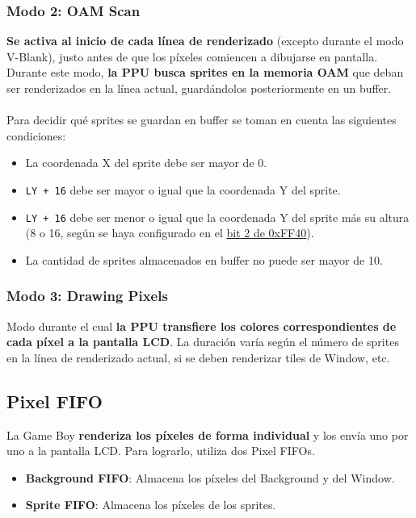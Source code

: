 \subsubsection{Modo 2: OAM Scan}
\textbf{Se activa al inicio de cada línea de renderizado} (excepto durante el modo V-Blank), justo antes de que los píxeles comiencen a dibujarse en pantalla. Durante este modo, \textbf{la PPU busca sprites en la memoria OAM} que deban ser renderizados en la línea actual, guardándolos posteriormente en un buffer.
\\\\
Para decidir qué sprites se guardan en buffer se toman en cuenta las siguientes condiciones:
\begin{itemize}
    \item La coordenada X del sprite debe ser mayor de 0.
    \item \texttt{LY + 16} debe ser mayor o igual que la coordenada Y del sprite.
    \item \texttt{LY + 16} debe ser menor o igual que la coordenada Y del sprite más su altura (8 o 16, según se haya configurado en el \hyperref[lcd_control]{bit 2 de 0xFF40}).
    \item La cantidad de sprites almacenados en buffer no puede ser mayor de 10.
\end{itemize}

\subsubsection{Modo 3: Drawing Pixels} \label{ppu:mode3}
Modo durante el cual \textbf{la PPU transfiere los colores correspondientes de cada píxel a la pantalla LCD}. La duración varía según el número de sprites en la línea de renderizado actual, si se deben renderizar tiles de Window, etc.

\subsection{Pixel FIFO}

La Game Boy \textbf{renderiza los píxeles de forma individual} y los envía uno por uno a la pantalla LCD. Para lograrlo, utiliza dos Pixel FIFOs.
\begin{itemize}
    \item \textbf{Background FIFO}: Almacena los píxeles del Background y del Window.
    \item \textbf{Sprite FIFO}: Almacena los píxeles de los sprites.
\end{itemize}


